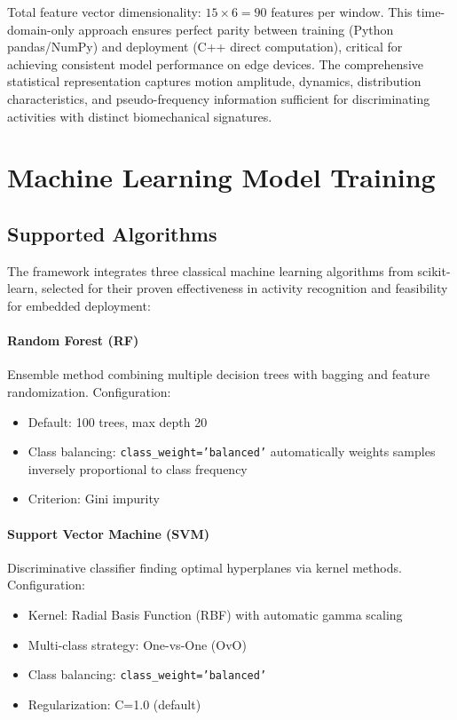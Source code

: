 Total feature vector dimensionality: $15 \times 6 = 90$ features per window. This time-domain-only approach ensures perfect parity between training (Python pandas/NumPy) and deployment (C++ direct computation), critical for achieving consistent model performance on edge devices. The comprehensive statistical representation captures motion amplitude, dynamics, distribution characteristics, and pseudo-frequency information sufficient for discriminating activities with distinct biomechanical signatures.

\section{Machine Learning Model Training}

\subsection{Supported Algorithms}
The framework integrates three classical machine learning algorithms from scikit-learn, selected for their proven effectiveness in activity recognition and feasibility for embedded deployment:

\paragraph{Random Forest (RF)}
Ensemble method combining multiple decision trees with bagging and feature randomization. Configuration:
\begin{itemize}
    \item Default: 100 trees, max depth 20
    \item Class balancing: \texttt{class\_weight='balanced'} automatically weights samples inversely proportional to class frequency
    \item Criterion: Gini impurity
\end{itemize}

\paragraph{Support Vector Machine (SVM)}
Discriminative classifier finding optimal hyperplanes via kernel methods. Configuration:
\begin{itemize}
    \item Kernel: Radial Basis Function (RBF) with automatic gamma scaling
    \item Multi-class strategy: One-vs-One (OvO)
    \item Class balancing: \texttt{class\_weight='balanced'}
    \item Regularization: C=1.0 (default)
\end{itemize}


